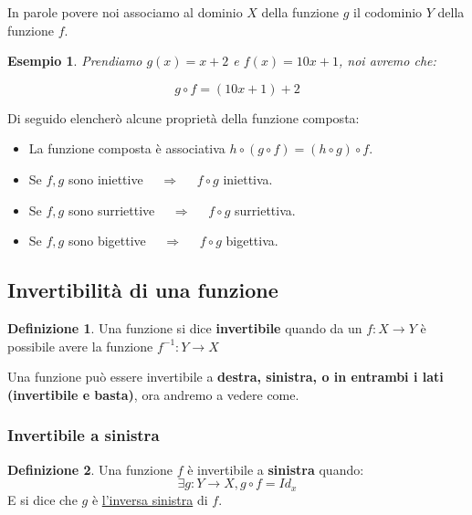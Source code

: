 \documentclass{article}
\newtheorem{exmp}{Esempio}[section]
\theoremstyle{definition}
\newtheorem{definition}{Definizione}[section]
\begin{document}
In parole povere noi associamo al dominio $ X $ della funzione $ g $ il codominio $ Y $ della funzione $ f $. \par
\begin{exmp}
        Prendiamo $ g(x) = x + 2 $ e $ f(x) = 10x + 1 $, noi avremo che:
                
                \begin{equation*}
                        g \circ f = (10x + 1) + 2
                \end{equation*}
\end{exmp}

Di seguido elencherò alcune proprietà della funzione composta:\label{proprietà_funzione_composta}
\begin{itemize}
        \item La funzione composta è associativa $ h \circ (g \circ f) =  (h \circ g ) \circ f$.
        \item Se $ f,g $ sono iniettive $\quad  \Rightarrow \quad $  $ f \circ g $ iniettiva.   
        \item Se $ f,g $ sono surriettive $\quad  \Rightarrow \quad $  $ f \circ g $ surriettiva.   
        \item Se $ f,g $ sono bigettive $\quad  \Rightarrow \quad $  $ f \circ g $ bigettiva.   
\end{itemize}



\subsection{Invertibilità di una funzione}\label{sec:invertibilità}
\begin{definition}
        Una funzione si dice \textbf{invertibile} quando da un $ f : X \to Y $ è possibile avere la funzione $ f^{-1} : Y \to X $   
\end{definition}

Una funzione può essere invertibile a \textbf{destra, sinistra, o in entrambi i lati (invertibile e basta)}, ora andremo a vedere come. 



\subsubsection{Invertibile a sinistra}\label{sec:invertibile_a_sinistra}
\begin{definition}     
        Una funzione $ f $  è invertibile a \textbf{sinistra} quando:
        \begin{equation*}
                \exists g : Y \to X, g \circ f = Id_x 
        \end{equation*}
        E si dice che $ g  $ è \underline{l'inversa sinistra} di $ f $.          
\end{definition}
\end{document}
